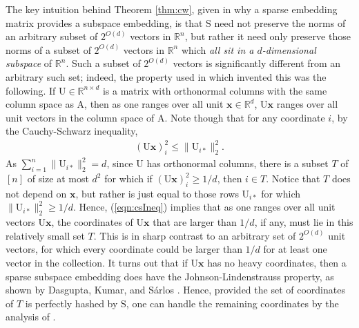 \documentclass[11pt]{article}
\newcommand{\mat}[1]{{\ensuremath{\bm{\mathrm{#1}}}}}
\def\matA{\mat{A}}
\def\matS{\mat{S}}
\def\matU{\mat{U}}
\def\x{{\mathbf x}}
\begin{document}
The key intuition behind Theorem \ref{thm:cw}, given in \cite{CW13} 
why a sparse embedding matrix provides a subspace embedding, is 
that $\matS$ need not preserve the norms
of an arbitrary subset of $2^{O(d)}$ vectors in $\mathbb{R}^n$, but rather it need only preserve those norms
of a subset of $2^{O(d)}$ vectors in $\mathbb{R}^n$ which {\it all sit in a $d$-dimensional subspace} of 
$\mathbb{R}^n$. Such a subset of $2^{O(d)}$ vectors is significantly different from an arbitrary such set; 
indeed, the property used in \cite{CW13} which invented this was the following. 
If $\matU \in \mathbb{R}^{n \times d}$ is a matrix
with orthonormal columns with the same column space as $\matA$, then as one ranges over all unit $\x \in \mathbb{R}^d$, 
$\matU \x$ ranges over all unit vectors in the column space of $\matA$. Note though that for any coordinate $i$, by the
Cauchy-Schwarz inequality, 
\begin{eqnarray}\label{eqn:csIneq}
(\matU \x)_i^2 \leq \|\matU_{i*}\|_2^2.
\end{eqnarray}
As $\sum_{i = 1}^n \|\matU_{i*}\|_2^2 = d$, since $\matU$ has orthonormal columns, there is a subset 
$T$ of $[n]$ of size at most $d^2$ for which if $(\matU\x)_i^2 \geq 1/d$, then $i \in T$. Notice that $T$ does not
depend on $\x$, but rather is just equal to those rows $\matU_{i*}$ for which $\|\matU_{i*}\|_2^2 \geq 1/d$. Hence,  
(\ref{eqn:csIneq}) implies that as one ranges over all unit
vectors $\matU \x$, the coordinates of $\matU\x$ that are larger than $1/d$, if any, must lie in this relatively
small set $T$. This
is in sharp contrast to an arbitrary set of $2^{O(d)}$ unit vectors, for which every coordinate could be larger than 
$1/d$ for at least one vector in the collection. It turns out that if $\matU \x$ has no heavy coordinates, then a
sparse subspace embedding does have the Johnson-Lindenstrauss property, 
as shown by Dasgupta, Kumar, and S\'arlos \cite{dks10}.
Hence, provided the set of coordinates of $T$ is perfectly hashed by $\matS$, one can handle the remaining coordinates
by the analysis of \cite{dks10}. 
\end{document}
